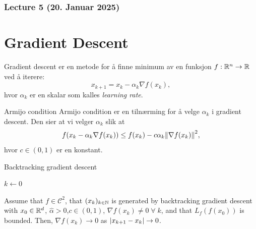 \subsubsection{Lecture 5 (20. Januar 2025)}

\section*{Gradient Descent}


Gradient descent er en metode for å finne minimum av en funksjon $f: \mathbb{R}^n \to \mathbb{R}$ ved å iterere:
\[
    x_{k+1} = x_k - \alpha_k \nabla f(x_k),
\]
hvor $\alpha_k$ er en skalar som kalles \emph{learning rate}.

\begin{remark}{Armijo condition}{}
    Armijo condition er en tilnærming for å velge $\alpha_k$ i gradient descent. Den sier at vi velger $\alpha_k$ slik at
    \[
        f(x_k - \alpha_k \nabla f(x_k)) \leq f(x_k) - c \alpha_k \norm{\nabla f(x_k)}^2,
    \]
    hvor $c \in (0, 1)$ er en konstant.
\end{remark}


\begin{algorithm}
    \caption{Backtracking gradient descent}
    \SetAlgoLined
    $k \gets 0$\;
\end{algorithm}


\begin{theorem}{}{}
    Assume that $f \in \mathcal{C}^2$, that $(x_k)_{k \in \mathbb{N}}$
    is generated by backtracking gradient descent with
    $x_0 \in \mathbb{R}^d$, $\hat{\alpha} > 0$,$c \in (0, 1)$, $\nabla f(x_k) \neq 0 \; \forall \; k$, and that
    $L_f(f(x_0))$ is bounded. Then, $\nabla f(x_k) \to 0$ as $\abs{x_{k+1} - x_k} \to 0$.
\end{theorem}

